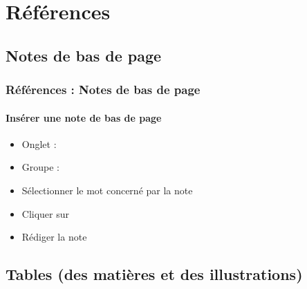 \documentclass[xcolor=table]{beamer}
\begin{document}
\section{Références}

%

\subsection{Notes de bas de page}

\begin{frame}[t]
\frametitle{Références : Notes de bas de page}
\framesubtitle{Insérer une note de bas de page}

\begin{minipage}{0.69\textwidth}
\begin{itemize}
	\item Onglet : 
	\item Groupe : 
\end{itemize}
\end{minipage}
\begin{minipage}{0.30\textwidth}
\end{minipage}

\begin{itemize}
	\item Sélectionner le mot concerné par la note
	\item Cliquer sur 
	\item Rédiger la note
\end{itemize}

\end{frame}

\subsection{Tables (des matières et des illustrations)}
\end{document}
